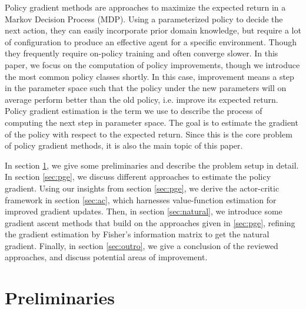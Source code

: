 Policy gradient methods are approaches to maximize the expected return in a Markov Decision Process (MDP). 
Using a parameterized policy to decide the next action, they can easily incorporate prior domain knowledge, but require a lot of configuration to produce an effective agent for a specific environment. 
Though they frequently require on-policy training and often converge slower. 
In this paper, we focus on the computation of policy improvements, though we introduce the most common policy classes shortly.
In this case, improvement means a step in the parameter space such that the policy under the new parameters will on average perform better than the old policy, i.e. improve its expected return. 
Policy gradient estimation is the term we use to describe the process of computing the next step in parameter space. 
The goal is to estimate the gradient of the policy with respect to the expected return. 
Since this is the core problem of policy gradient methods, it is also the main topic of this paper.

In section \ref{sec:prel}, we give some preliminaries and describe the problem setup in detail. 
In section \ref{sec:pge}, we discuss different approaches to estimate the policy gradient. 
Using our insights from section \ref{sec:pge}, we derive the actor-critic framework in section \ref{sec:ac}, which harnesses value-function estimation for improved gradient updates. 
Then, in section \ref{sec:natural}, we introduce some gradient ascent methods that build on the approaches given in \ref{sec:pge}, refining the gradient estimation by Fisher's information matrix to get the natural gradient. 
Finally, in section \ref{sec:outro}, we give a conclusion of the reviewed approaches, and discuss potential areas of improvement.

\section{Preliminaries}
\label{sec:prel}

